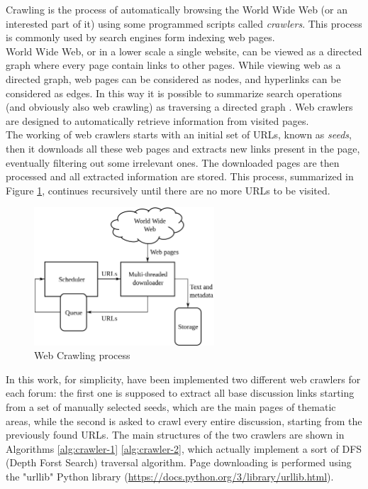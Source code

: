 Crawling is the process of automatically browsing the World Wide Web (or an interested part of it) using some programmed scripts called \textit{crawlers}. This process is commonly used by search engines form indexing web pages.\\
World Wide Web, or in a lower scale a single website, can be viewed as a directed graph where every page contain links to other pages. While viewing web as a directed graph, web pages can be considered as nodes, and hyperlinks can be considered as edges. In this way it is possible to summarize search operations (and obviously also web crawling) as traversing a directed graph \cite{article-web-crawling}. Web crawlers are designed to automatically retrieve information from visited pages.\\
The working of web crawlers starts with an initial set of URLs, known as \textit{seeds}, then it downloads all these web pages and extracts new links present in the page, eventually filtering out some irrelevant ones. The downloaded pages are then processed and all extracted information are stored. This process, summarized in Figure \ref{fig:web-crawler}, continues recursively until there are no more URLs to be visited. 

\begin{figure}[ht]
	\centering
	\includegraphics[width=0.6\textwidth]{figures/web-crawler.png}
	\caption{Web Crawling process}
	\label{fig:web-crawler}
\end{figure}

In this work, for simplicity, have been implemented two different web crawlers for each forum: the first one is supposed to extract all base discussion links starting from a set of manually selected seeds, which are the main pages of thematic areas, while the second is asked to crawl every entire discussion, starting from the previously found URLs. The main structures of the two crawlers are shown in Algorithms \ref{alg:crawler-1} \ref{alg:crawler-2}, which actually implement a sort of DFS (Depth Forst Search) traversal algorithm. Page downloading is performed using the "urllib" Python library (\url{https://docs.python.org/3/library/urllib.html}).

